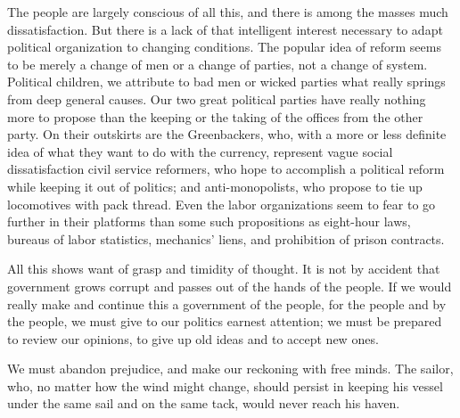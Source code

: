 \documentclass{book}
\begin{document}
The people are largely conscious of all this, and there is among the masses much dissatisfaction. But there is a lack of that intelligent interest necessary to adapt political organization to changing conditions. The popular idea of reform seems to be merely a change of men or a change of parties, not a change of system. Political children, we attribute to bad men or wicked parties what really springs from deep general causes. Our two great political parties have really nothing more to propose than the keeping or the taking of the offices from the other party. On their outskirts are the Greenbackers, who, with a more or less definite idea of what they want to do with the currency, represent vague social dissatisfaction civil service reformers, who hope to accomplish a political reform while keeping it out of politics; and anti-monopolists, who propose to tie up locomotives with pack thread. Even the labor organizations seem to fear to go further in their platforms than some such propositions as eight-hour laws, bureaus of labor statistics, mechanics’ liens, and prohibition of prison contracts.

All this shows want of grasp and timidity of thought. It is not by accident that government grows corrupt and passes out of the hands of the people. If we would really make and continue this a government of the people, for the people and by the people, we must give to our politics earnest attention; we must be prepared to review our opinions, to give up old ideas and to accept new ones.

We must abandon prejudice, and make our reckoning with free minds. The sailor, who, no matter how the wind might change, should persist in keeping his vessel under the same sail and on the same tack, would never reach his haven.
\end{document}
